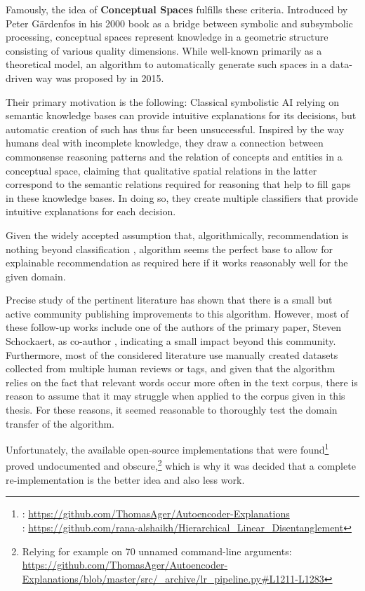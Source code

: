 Famously, the idea of \textbf{Conceptual Spaces} fulfills these criteria. Introduced by Peter Gärdenfos in his 2000 book  \cite{Gardenfors2000a} as a bridge between symbolic and subsymbolic processing, conceptual spaces represent knowledge in a geometric structure consisting of various quality dimensions. While well-known primarily as a theoretical model, an algorithm to automatically generate such spaces in a data-driven way was proposed by \textcite{Derrac2015} in 2015.

Their primary motivation is the following: Classical symbolistic AI relying on semantic knowledge bases can provide intuitive explanations for its decisions, but automatic creation of such has thus far been unsuccessful. Inspired by the way humans deal with incomplete knowledge, they draw a connection between commonsense reasoning patterns and the relation of concepts and entities in a conceptual space, claiming that qualitative spatial relations in the latter correspond to the semantic relations required for reasoning that help to fill gaps in these knowledge bases. In doing so, they create multiple classifiers that provide intuitive explanations for each decision. 

Given the widely accepted assumption that, algorithmically, recommendation is nothing beyond classification \cite{Linden2003,Ai2018,Sarwar2000},  algorithm seems the perfect base to allow for explainable recommendation as required here if it works reasonably well for the given domain.

Precise study of the pertinent literature has shown that there is a small but active community publishing improvements to this algorithm. However, most of these follow-up works include one of the authors of the primary paper, Steven Schockaert, as co-author \cite{Ager2018,Alshaikh2020}, indicating a small impact beyond this community. Furthermore, most of the considered literature use manually created datasets collected from multiple human reviews or tags, and given that the algorithm relies on the fact that relevant words occur more often in the text corpus, there is reason to assume that it may struggle when applied to the corpus given in this thesis. For these reasons, it seemed reasonable to thoroughly test the domain transfer of the algorithm.

Unfortunately, the available open-source implementations that were found\footnote{\cite{Ager2018}: \url{https://github.com/ThomasAger/Autoencoder-Explanations}\\ \indent {} \cite{Alshaikh2020}: \url{https://github.com/rana-alshaikh/Hierarchical_Linear_Disentanglement}} proved undocumented and obscure,\footnote{Relying for example on 70 unnamed command-line arguments: \url{https://github.com/ThomasAger/Autoencoder-Explanations/blob/master/src/_archive/lr_pipeline.py\#L1211-L1283}}
 which is why it was decided that a complete re-implementation is the better idea and also less work. 

